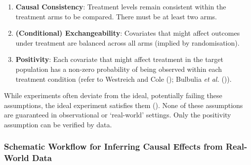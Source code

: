 \documentclass[
  single column]{article}
\providecommand{\tightlist}{%
  \setlength{\itemsep}{0pt}\setlength{\parskip}{0pt}}\usepackage{longtable,booktabs,array}
\begin{document}
\begin{enumerate}
\def\labelenumi{\arabic{enumi}.}
\tightlist
\item
  \textbf{Causal Consistency}: Treatment levels remain consistent within
  the treatment arms to be compared. There must be at least two arms.
\item
  \textbf{(Conditional) Exchangeability}: Covariates that might affect
  outcomes under treatment are balanced across all arms (implied by
  randomisation).
\item
  \textbf{Positivity}: Each covariate that might affect treatment in the
  target population has a non-zero probability of being observed within
  each treatment condition (refer to Westreich and Cole
  (); Bulbulia \emph{et al.}
  ()).
\end{enumerate}

While experiments often deviate from the ideal, potentially failing
these assumptions, the ideal experiment satisfies them
(). None of these
assumptions are guaranteed in observational or `real-world' settings.
Only the positivity assumption can be verified by data.

\subsubsection{Schematic Workflow for Inferring Causal Effects from
Real-World
Data}\label{schematic-workflow-for-inferring-causal-effects-from-real-world-data}
\end{document}
